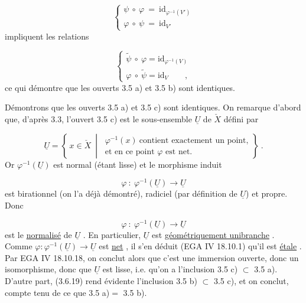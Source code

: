 
\begin{equation*}
 \left\{ \begin{array}{l} \psi \ \circ \ \varphi \ = \ \mathrm{id}_{\varphi^{-1}(V')} \\[3ex] \varphi \ \circ \ \psi \ = \ \mathrm{id}_{V'} \end{array} \right.
\end{equation*}
impliquent les relations

\begin{equation*}
\left\{ \begin{array}{l} \widetilde{\psi} \ \circ \ \varphi = \mathrm{id}_{\varphi^{-1}(V)} \\[3ex] \varphi \ \circ \ \widetilde{\psi} = \mathrm{id}_{V} \qquad , \end{array} \right.
\end{equation*}
ce qui démontre que les ouverts 3.5 a) et 3.5 b) sont identiques.

Démontrons que les ouverts 3.5 a) et 3.5 c) sont identiques. On remarque d'abord que, d'après 3.3, l'ouvert 3.5 c) est le sous-ensemble $\underline{U}$ de $\check{X}$ défini par

\begin{equation}\tag{3.6.19}
\underline{U} = \left\{\, x \in \check{X} \ \middle|\ \begin{array}{l} \varphi^{-1}(x) \ \mbox{contient exactement un point,} \\ \mbox{et en ce point } \varphi \mbox{ est net.} \end{array} \right\} \ .
\end{equation}
Or $\varphi^{-1}(\underline{U})$ est normal (étant lisse) et le morphisme induit

\begin{equation*}
\varphi \ : \ \varphi^{-1}(\underline{U}) \longrightarrow \underline{U}
\end{equation*}
est birationnel (on l'a déjà démontré), radiciel (par définition de $\underline{U}$) et propre. Donc

\begin{equation*}
\varphi \ : \ \varphi^{-1}(\underline{U}) \longrightarrow \underline{U}
\end{equation*}
est le \underline{normalisé} de $\underline{U}$ . En particulier, $\underline{U}$ est \underline{géométriquement unibranche} . Comme $\varphi : \varphi^{-1}(\underline{U}) \longrightarrow \underline{U}$ est \underline{net} , il s'en déduit (EGA IV 18.10.1) qu'il est \underline{étale} . Par EGA IV 18.10.18, on conclut alors que c'est une immersion ouverte, donc un isomorphisme, donc que
$\underline{U}$ est lisse, i.e. qu'on a l'inclusion 3.5 c) $\subset$ 3.5 a). D'autre part, (3.6.19) rend évidente l'inclusion 3.5 b) $\subset$ 3.5 c), et on conclut, compte tenu de ce que 3.5 a)$=$ 3.5 b).

